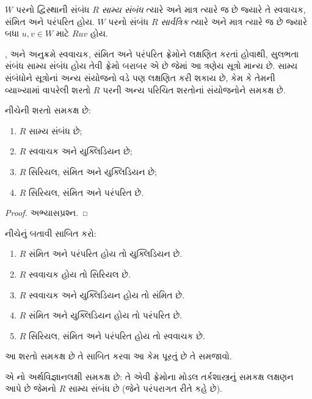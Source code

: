 \begin{defn}
  $W$ પરનો દ્વિસ્થાની સંબંધ $R$ \emph{સામ્ય સંબંધ}
  ત્યારે અને માત્ર ત્યારે જ છે જ્યારે તે સ્વવાચક,
  સંમિત અને પરંપરિત હોય. $W$ પરનો સંબંધ $R$
  \emph{સાર્વત્રિક} ત્યારે અને માત્ર ત્યારે જ છે જ્યારે
  બધા $u,v \in
  W$ માટે $Ruv$ હોય.
\end{defn}

,  અને  અનુક્રમે સ્વવાચક,
સંમિત અને પરંપરિત ફ્રેમોને લક્ષણિત કરતાં હોવાથી,
સુલભતા સંબંધ સામ્ય સંબંધ હોય તેવી ફ્રેમો બરાબર
એ છે જેમાં આ ત્રણેય સૂત્રો માન્ય છે.
સામ્ય સંબંધોને સૂત્રોનાં અન્ય સંયોજનો વડે
પણ લક્ષણિત કરી શકાય છે, કેમ કે તેમની વ્યાખ્યામાં
વાપરેલી શરતો $R$ પરની અન્ય પરિચિત શરતોનાં
સંયોજનોને સમકક્ષ છે.

\begin{prop}
  નીચેની શરતો સમકક્ષ છે:
  \begin{enumerate}
  \item $R$ સામ્ય સંબંધ છે;
  \item $R$ સ્વવાચક અને યુક્લિડિયન છે;
  \item $R$ સિરિયલ, સંમિત અને યુક્લિડિયન છે;
  \item $R$ સિરિયલ, સંમિત અને પરંપરિત છે.
  \end{enumerate}
\end{prop}

\begin{proof}
  અભ્યાસપ્રશ્ન.
\end{proof}

\begin{prob}
  નીચેનું બતાવી 
  સાબિત કરો:
  \begin{enumerate}
  \item $R$ સંમિત અને પરંપરિત હોય તો યુક્લિડિયન છે.
  \item $R$ સ્વવાચક હોય તો સિરિયલ છે.
  \item $R$ સ્વવાચક અને યુક્લિડિયન હોય તો સંમિત છે.
  \item $R$ સંમિત અને યુક્લિડિયન હોય તો પરંપરિત છે.
  \item $R$ સિરિયલ, સંમિત અને પરંપરિત હોય તો સ્વવાચક છે.
  \end{enumerate}
  આ શરતો સમકક્ષ છે તે સાબિત કરવા આ કેમ પૂરતું છે
  તે સમજાવો.
\end{prob}

 એ નો
અર્થવિજ્ઞાનલક્ષી સમકક્ષ છે: તે એવી ફ્રેમોના મોડલ
તર્કશાસ્ત્રનું સમકક્ષ લક્ષણન આપે છે જેમનો $R$
સામ્ય સંબંધ છે (જેને પરંપરાગત રીતે  કહે છે).


